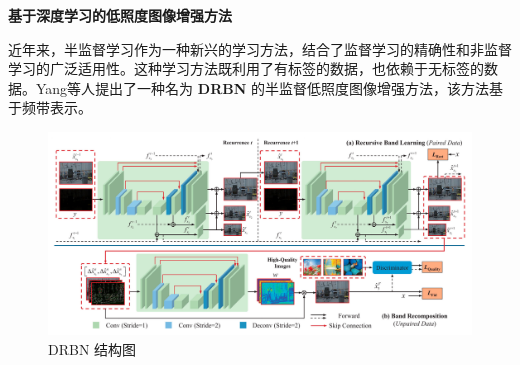 \documentclass[CJK,aspectratio=169]{beamer}  %
\begin{document}
	\begin{frame}
		{ \yahei \textbf{基于深度学习的低照度图像增强方法}}
		
		{ \yahei 近年来，半监督学习作为一种新兴的学习方法，结合了监督学习的精确性和非监督学习的广泛适用性。这种学习方法既利用了有标签的数据，也依赖于无标签的数据。Yang等人\textcolor{blue}{\citep{qiao2021deep}}提出了一种名为 \textbf{DRBN} 的半监督低照度图像增强方法，该方法基于频带表示。}
		
		\begin{figure}
			\centering
			\setlength{\abovecaptionskip}{-0.05cm}
			\begin{minipage}{.7\columnwidth}
				\centering 
				\includegraphics[width=\columnwidth]{picture/LLIE/DRBN/DRBN}
				\caption{
					\tiny DRBN 结构图
				}
			\end{minipage}
		\end{figure}
		
	\end{frame}
	
\end{document}
